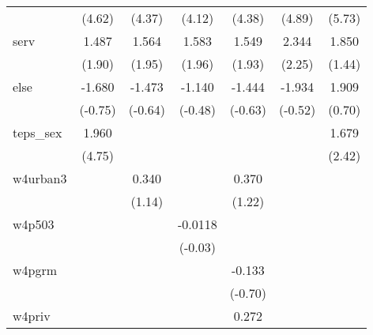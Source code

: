 {\begin{tabular}{l*{6}{c}}
            &      (4.62)         &      (4.37)         &      (4.12)         &      (4.38)         &      (4.89)         &      (5.73)         \\
[1em]
serv        &       1.487         &       1.564         &       1.583         &       1.549         &       2.344\sym{*}  &       1.850         \\
            &      (1.90)         &      (1.95)         &      (1.96)         &      (1.93)         &      (2.25)         &      (1.44)         \\
[1em]
else        &      -1.680         &      -1.473         &      -1.140         &      -1.444         &      -1.934         &       1.909         \\
            &     (-0.75)         &     (-0.64)         &     (-0.48)         &     (-0.63)         &     (-0.52)         &      (0.70)         \\
[1em]
teps\_sex    &       1.960\sym{***}&                     &                     &                     &                     &       1.679\sym{*}  \\
            &      (4.75)         &                     &                     &                     &                     &      (2.42)         \\
[1em]
w4urban3    &                     &       0.340         &                     &       0.370         &                     &                     \\
            &                     &      (1.14)         &                     &      (1.22)         &                     &                     \\
[1em]
w4p503      &                     &                     &     -0.0118         &                     &                     &                     \\
            &                     &                     &     (-0.03)         &                     &                     &                     \\
[1em]
w4pgrm      &                     &                     &                     &      -0.133         &                     &                     \\
            &                     &                     &                     &     (-0.70)         &                     &                     \\
[1em]
w4priv      &                     &                     &                     &       0.272         &                     &                     \\

\end{tabular}}
